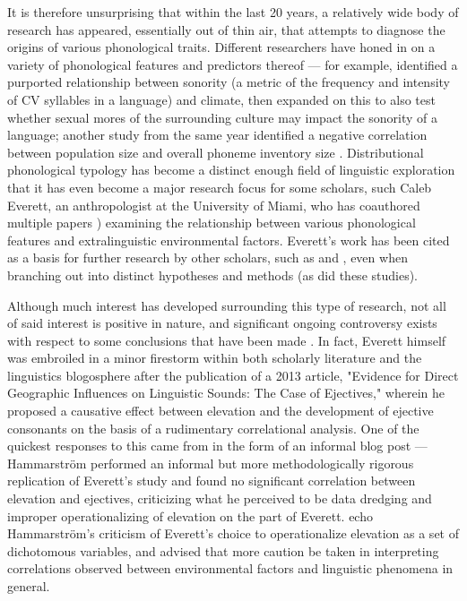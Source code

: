 \documentclass{article}
\begin{document}
It is therefore unsurprising that within the last 20 years, a relatively wide body of research has appeared, essentially out of thin air, that attempts to diagnose the origins of various phonological traits. Different researchers have honed in on a variety of phonological features and predictors thereof — for example, \textcite{fought2004} identified a purported relationship between sonority (a metric of the frequency and intensity of CV syllables in a language) and climate, then \textcite{ember2007} expanded on this to also test whether sexual mores of the surrounding culture may impact the sonority of a language; another study from the same year identified a negative correlation between population size and overall phoneme inventory size \parencite{hay2007}. Distributional phonological typology has become a distinct enough field of linguistic exploration that it has even become a major research focus for some scholars, such Caleb Everett, an anthropologist at the University of Miami, who has coauthored multiple papers \parencite{everett2013,everett2015,everett2016}) examining the relationship between various phonological features and extralinguistic environmental factors. Everett's work has been cited as a basis for further research by other scholars, such as \textcite{bentz2018} and \textcite{noelle2020}, even when branching out into distinct hypotheses and methods (as did these studies).

Although much interest has developed surrounding this type of research, not all of said interest is positive in nature, and significant ongoing controversy exists with respect to some conclusions that have been made \parencite{ladd2015}. In fact, Everett himself was embroiled in a minor firestorm within both scholarly literature and the linguistics blogosphere after the publication of a 2013 article, "Evidence for Direct Geographic Influences on Linguistic Sounds: The Case of Ejectives," wherein he proposed a causative effect between elevation and the development of ejective consonants on the basis of a rudimentary correlational analysis. One of the quickest responses to this came from \textcite{hammarstroem2013} in the form of an informal blog post — Hammarström performed an informal but more methodologically rigorous replication of Everett's study and found no significant correlation between elevation and ejectives, criticizing what he perceived to be data dredging and improper operationalizing of elevation on the part of Everett. \textcite{haynie2014,dediu2017} echo Hammarström's criticism of Everett's choice to operationalize elevation as a set of dichotomous variables, and \textcite{haynie2014} advised that more caution be taken in interpreting correlations observed between environmental factors and linguistic phenomena in general.
\end{document}
